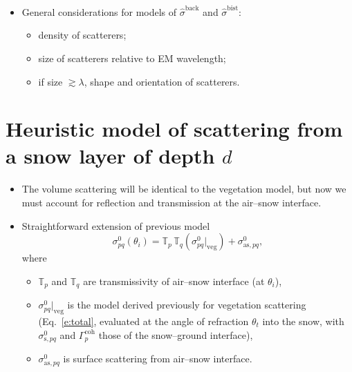 \documentclass[11pt, oneside]{article}
\begin{document}
\begin{itemize}
	\item General considerations for models of $\hat{\sigma}^\mathrm{back}$ and $\hat{\sigma}^\mathrm{bist}$:
	\begin{itemize}
		\item density of scatterers;
		\item size of scatterers relative to EM wavelength;
		\item if size $\gtrsim\lambda$, shape and orientation of scatterers.
	\end{itemize}
\end{itemize}

\section{Heuristic model of scattering from a snow layer of depth $d$}
\label{s:snow}

\begin{itemize}
	\item The volume scattering will be identical to the vegetation model, but now we must account for reflection and transmission at the air--snow interface.
	\item Straightforward extension of previous model
	\begin{equation}
		\label{e:snow}
		\sigma^0_{pq}(\theta_i) = \mathbb{T}_p\,\mathbb{T}_q\left(\sigma^0_{pq}\big|_\mathrm{veg}\right) + \sigma^0_{\mathrm{as},pq},
	\end{equation}
	where
	\begin{itemize}
		\item[] $\mathbb{T}_p$ and $\mathbb{T}_q$ are transmissivity of air--snow interface (at $\theta_i$),
		\item[] $\sigma^0_{pq}|_\mathrm{veg}$ is the model derived previously for vegetation scattering (Eq.~\eqref{e:total}, evaluated at the angle of refraction $\theta_t$ into the snow, with $\sigma^0_{\mathrm{s},pq}$ and $\Gamma_p^\mathrm{coh}$ those of the snow--ground interface),
		\item[] $\sigma^0_{\mathrm{as},pq}$ is surface scattering from air--snow interface.
	\end{itemize}
\end{itemize}
\end{document}
